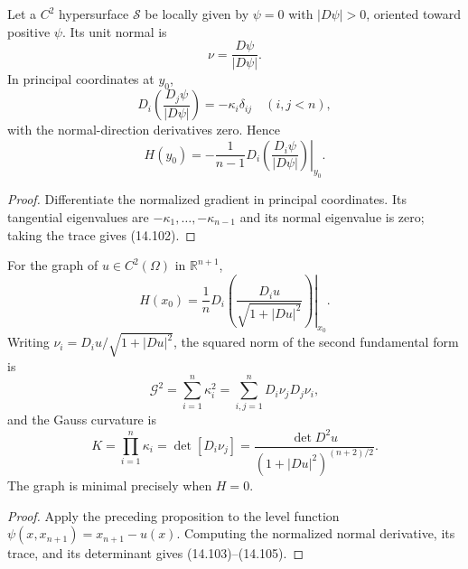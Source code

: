 \begin{proposition}
\label{gt14-prop-level-hypersurface-curvature}
Let a $C^2$ hypersurface $\mathcal S$ be locally given by $\psi=0$ with
$|D\psi|>0$, oriented toward positive $\psi$. Its unit normal is
\begin{equation}
\nu=\frac{D\psi}{|D\psi|}.
\tag{14.100}
\end{equation}
In principal coordinates at $y_0$,
\begin{equation}
D_i\left(\frac{D_j\psi}{|D\psi|}\right)
=-\kappa_i\delta_{ij}\quad(i,j<n),
\tag{14.101}
\end{equation}
with the normal-direction derivatives zero. Hence
\begin{equation}
H(y_0)=-\frac1{n-1}
\left.D_i\left(\frac{D_i\psi}{|D\psi|}\right)\right|_{y_0}.
\tag{14.102}
\end{equation}
\end{proposition}
\begin{proof}
\sketch Differentiate the normalized gradient in principal coordinates. Its
tangential eigenvalues are $-\kappa_1,\ldots,-\kappa_{n-1}$ and its normal
eigenvalue is zero; taking the trace gives (14.102).
\end{proof}

\begin{corollary}
\label{gt14-cor-graph-curvatures}
For the graph of $u\in C^2(\Omega)$ in $\mathbb R^{n+1}$,
\begin{equation}
H(x_0)=\frac1n
\left.D_i\left(\frac{D_iu}{\sqrt{1+|Du|^2}}\right)\right|_{x_0}.
\tag{14.103}
\end{equation}
Writing $\nu_i=D_iu/\sqrt{1+|Du|^2}$, the squared norm of the second
fundamental form is
\begin{equation}
\mathcal G^2=\sum_{i=1}^n\kappa_i^2
=\sum_{i,j=1}^nD_i\nu_jD_j\nu_i,
\tag{14.104}
\end{equation}
and the Gauss curvature is
\begin{equation}
K=\prod_{i=1}^n\kappa_i
=\det[D_i\nu_j]
=\frac{\det D^2u}{(1+|Du|^2)^{(n+2)/2}}.
\tag{14.105}
\end{equation}
The graph is minimal precisely when $H=0$.
\end{corollary}
\begin{proof}
\sketch Apply the preceding proposition to the level function
$\psi(x,x_{n+1})=x_{n+1}-u(x)$. Computing the normalized normal derivative,
its trace, and its determinant gives (14.103)--(14.105).
\end{proof}
